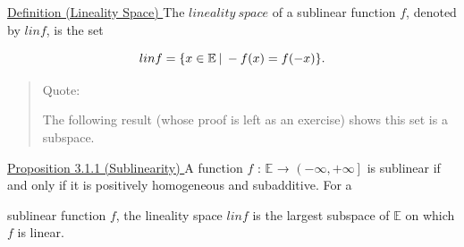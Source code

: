 \documentclass[a4paper,11pt]{jsarticle}
\begin{document}
\begin{itembox}[l]{\underline{Definition (Lineality Space) }}
  The $lineality\:space$ of a
  sublinear function $f$, denoted by $lin f$, is the set

  \begin{equation}
    lin f = \{x \in \mathbb{E}\:|\:-f(x) = f(-x)\}. \notag
  \end{equation}
\end{itembox}

\begin{quote}
  Quote:

  The following result (whose proof is left as an exercise) shows this set is a subspace.

\end{quote}

\begin{itembox}[l]{\underline{Proposition 3.1.1 (Sublinearity) }}
  A function $f$ : $\mathbb{E}$ → $ \left ( -\infty ,+\infty \right ] $ is sublinear if and only if it is positively homogeneous and subadditive. For a

sublinear function $f$, the lineality space $lin f$ is the largest subspace of $\mathbb{E}$ on
which $f$ is linear.
\end{itembox}
\end{document}
